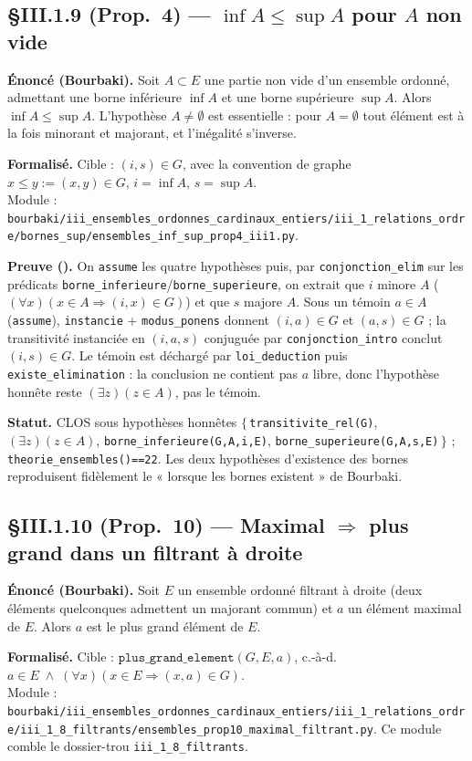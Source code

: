 \subsection{§III.1.9 (Prop.~4) --- $\inf A \le \sup A$ pour $A$ non vide}
\textbf{Énoncé (Bourbaki).} Soit $A \subset E$ une partie non vide d'un ensemble ordonné, admettant une borne inférieure $\inf A$ et une borne supérieure $\sup A$. Alors $\inf A \le \sup A$. L'hypothèse $A \neq \emptyset$ est essentielle : pour $A = \emptyset$ tout élément est à la fois minorant et majorant, et l'inégalité s'inverse.

\textbf{Formalisé.} Cible : $(i,s) \in G$, avec la convention de graphe $x \le y := (x,y)\in G$, $i = \inf A$, $s = \sup A$. \\
Module : \texttt{bourbaki/iii\_ensembles\_ordonnes\_cardinaux\_entiers/iii\_1\_relations\_ordre/bornes\_sup/ensembles\_inf\_sup\_prop4\_iii1.py}.

\textbf{Preuve (\Nstar).} On \texttt{assume} les quatre hypothèses puis, par \texttt{conjonction\_elim} sur les prédicats \texttt{borne\_inferieure}/\texttt{borne\_superieure}, on extrait que $i$ minore $A$ ($(\forall x)(x\in A \Rightarrow (i,x)\in G)$) et que $s$ majore $A$. Sous un témoin $a \in A$ (\texttt{assume}), \texttt{instancie} + \texttt{modus\_ponens} donnent $(i,a)\in G$ et $(a,s)\in G$ ; la transitivité instanciée en $(i,a,s)$ conjuguée par \texttt{conjonction\_intro} conclut $(i,s)\in G$. Le témoin est déchargé par \texttt{loi\_deduction} puis \texttt{existe\_elimination} : la conclusion ne contient pas $a$ libre, donc l'hypothèse honnête reste $(\exists z)(z\in A)$, pas le témoin.

\textbf{Statut.} CLOS sous hypothèses honnêtes $\{\,$\texttt{transitivite\_rel(G)}, $(\exists z)(z\in A)$, \texttt{borne\_inferieure(G,A,i,E)}, \texttt{borne\_superieure(G,A,s,E)}$\,\}$ ; \texttt{theorie\_ensembles()==22}. Les deux hypothèses d'existence des bornes reproduisent fidèlement le « lorsque les bornes existent » de Bourbaki.

\subsection{§III.1.10 (Prop.~10) --- Maximal $\Rightarrow$ plus grand dans un filtrant à droite}
\textbf{Énoncé (Bourbaki).} Soit $E$ un ensemble ordonné filtrant à droite (deux éléments quelconques admettent un majorant commun) et $a$ un élément maximal de $E$. Alors $a$ est le plus grand élément de $E$.

\textbf{Formalisé.} Cible : $\texttt{plus\_grand\_element}(G,E,a)$, c.-à-d. $a\in E \;\wedge\; (\forall x)(x\in E \Rightarrow (x,a)\in G)$. \\
Module : \texttt{bourbaki/iii\_ensembles\_ordonnes\_cardinaux\_entiers/iii\_1\_relations\_ordre/iii\_1\_8\_filtrants/ensembles\_prop10\_maximal\_filtrant.py}. Ce module comble le dossier-trou \texttt{iii\_1\_8\_filtrants}.

